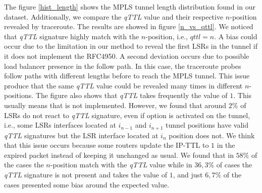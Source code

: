 The figure \ref{hist_length} shows the MPLS tunnel length distribution found in our dataset. Additionally,  we compare the \textit{qTTL} value and their respective $n$-position revealed by traceroute. The
results are showed in figure \ref{n_vs_qttl}. We noticed that \textit{qTTL}
signature highly match with the $n$-position, i.e., $q\textit{ttl}=n$.  A bias could
occur due to the limitation in our method to reveal the first LSRs in
the tunnel if it does not implement the RFC4950. %
A second deviation
occurs due to possible load balancer presence in the follow path. In this case,
the traceroute probes follow paths with different lengths before to reach the
MPLS tunnel. This issue
produce that the same \textit{qTTL} value could be revealed many times in different
$n$-positions. The figure also shows that \textit{qTTL} 
takes frequently the value of $1$. This usually  means that \tpropagate is not implemented. However, we found that around $2\%$ of LSRs do not react to \textit{qTTL} signature, even if \tpropagate option is activated on the tunnel, i.e., some LSRs interfaces located at $i_{n-1}$  and $i_{n+1}$ tunnel positions have valid \textit{qTTL} signatures but the LSR interface located at $i_n$ position does not. We think that this issue occurs because some
routers update the IP-TTL to $1$ in the expired packet instead of keeping it
unchanged as usual. We found that in $58\%$ of the cases the $n$-position match with the
\textit{qTTL} value while in $36,3\%$ of cases the \textit{qTTL} signature is not
present and takes the value of $1$, and just $6,7\%$ of the cases presented
some bias around the expected value.


